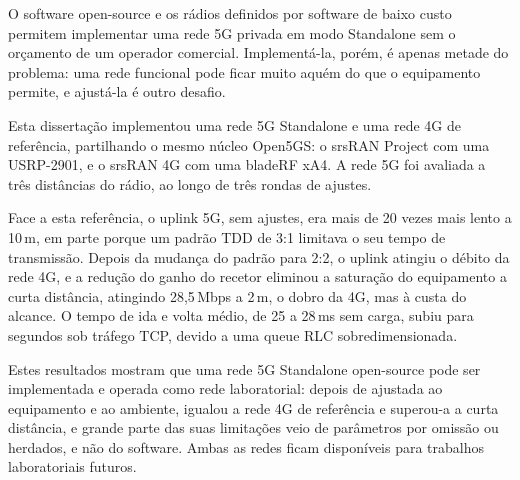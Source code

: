 
%

O software open-source e os rádios definidos por software de baixo custo permitem implementar uma rede 5G privada em modo Standalone sem o orçamento de um operador comercial. Implementá-la, porém, é apenas metade do problema: uma rede funcional pode ficar muito aquém do que o equipamento permite, e ajustá-la é outro desafio.

Esta dissertação implementou uma rede 5G Standalone e uma rede 4G de referência, partilhando o mesmo núcleo Open5GS: o srsRAN Project com uma USRP-2901, e o srsRAN 4G com uma bladeRF xA4. A rede 5G foi avaliada a três distâncias do rádio, ao longo de três rondas de ajustes.

Face a esta referência, o uplink 5G, sem ajustes, era mais de 20 vezes mais lento a 10\,m, em parte porque um padrão TDD de 3:1 limitava o seu tempo de transmissão. Depois da mudança do padrão para 2:2, o uplink atingiu o débito da rede 4G, e a redução do ganho do recetor eliminou a saturação do equipamento a curta distância, atingindo 28,5\,Mbps a 2\,m, o dobro da 4G, mas à custa do alcance. O tempo de ida e volta médio, de 25 a 28\,ms sem carga, subiu para segundos sob tráfego TCP, devido a uma queue RLC sobredimensionada.

Estes resultados mostram que uma rede 5G Standalone open-source pode ser implementada e operada como rede laboratorial: depois de ajustada ao equipamento e ao ambiente, igualou a rede 4G de referência e superou-a a curta distância, e grande parte das suas limitações veio de parâmetros por omissão ou herdados, e não do software. Ambas as redes ficam disponíveis para trabalhos laboratoriais futuros.

